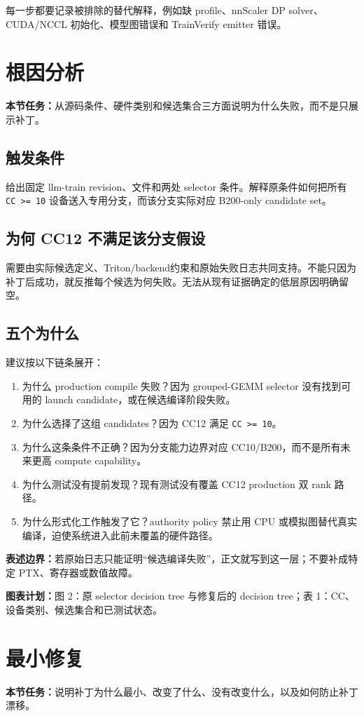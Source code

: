 \documentclass[11pt,a4paper]{ctexart}
\newcommand{\contract}[1]{\par\smallskip\noindent\colorbox{light}{\parbox{0.95\linewidth}{\textbf{本节任务：}#1}}\par\smallskip}
\newcommand{\figplan}[1]{\par\noindent\textbf{图表计划：}#1\par}
\newcommand{\boundary}[1]{\par\noindent\textbf{表述边界：}#1\par}
\begin{document}
每一步都要记录被排除的替代解释，例如缺 profile、nnScaler DP solver、CUDA/NCCL 初始化、模型图错误和 TrainVerify emitter 错误。

\section{根因分析}
\contract{从源码条件、硬件类别和候选集合三方面说明为什么失败，而不是只展示补丁。}

\subsection{触发条件}
给出固定 llm-train revision、文件和两处 selector 条件。解释原条件如何把所有 \texttt{CC >= 10} 设备送入专用分支，而该分支实际对应 B200-only candidate set。

\subsection{为何 CC12 不满足该分支假设}
需要由实际候选定义、Triton/backend约束和原始失败日志共同支持。不能只因为补丁后成功，就反推每个候选为何失败。无法从现有证据确定的低层原因明确留空。

\subsection{五个为什么}
建议按以下链条展开：
\begin{enumerate}
  \item 为什么 production compile 失败？因为 grouped-GEMM selector 没有找到可用的 launch candidate，或在候选编译阶段失败。
  \item 为什么选择了这组 candidates？因为 CC12 满足 \texttt{CC >= 10}。
  \item 为什么这条条件不正确？因为分支能力边界对应 CC10/B200，而不是所有未来更高 compute capability。
  \item 为什么测试没有提前发现？现有测试没有覆盖 CC12 production 双 rank 路径。
  \item 为什么形式化工作触发了它？authority policy 禁止用 CPU 或模拟图替代真实编译，迫使系统进入此前未覆盖的硬件路径。
\end{enumerate}

\boundary{若原始日志只能证明“候选编译失败”，正文就写到这一层；不要补成特定 PTX、寄存器或数值故障。}
\figplan{图 2：原 selector decision tree 与修复后的 decision tree；表 1：CC、设备类别、候选集合和已测试状态。}

\section{最小修复}
\contract{说明补丁为什么最小、改变了什么、没有改变什么，以及如何防止补丁漂移。}
\end{document}
